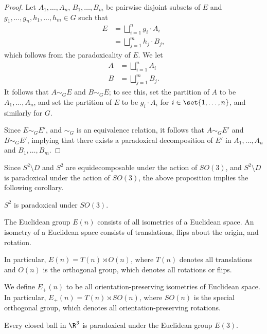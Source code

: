 \documentclass[12pt]{mypackage}
\begin{document}
\begin{proof}
  Let $A_1,\dots,A_n$, $B_1,\dots,B_m$ be pairwise disjoint subsets of $E$ and $g_1,\dots,g_n,h_1,\dots,h_m\in G$ such that
  \begin{align*}
    E &= \bigsqcup_{i=1}^{n} g_i\cdot A_i\\
      &= \bigsqcup_{j=1}^{m}h_j\cdot B_j,
  \end{align*}
  which follows from the paradoxicality of $E$. We let
  \begin{align*}
    A &= \bigsqcup_{i=1}^{n}A_i\\
    B &= \bigsqcup_{j=1}^{m} B_j.
  \end{align*}
  It follows that $A\sim_{G} E$ and $B\sim_{G} E$; to see this, set the partition of $A$ to be $A_1,\dots,A_n$, and set the partition of $E$ to be $g_i\cdot A_i$ for $i\in \set{1,\dots,n}$, and similarly for $G$.\newline

  Since $E\sim_{G} E'$, and $\sim_{G}$ is an equivalence relation, it follows that $A\sim_{G}E'$ and $B\sim_{G}E'$, implying that there exists a paradoxical decomposition of $E'$ in $A_1,\dots,A_n$ and $B_1,\dots,B_m$.
\end{proof}
Since $S^{2}\setminus D$ and $S^{2}$ are equidecomposable under the action of $SO(3)$, and $S^{2}\setminus D$ is paradoxical under the action of $SO(3)$, the above proposition implies the following corollary.
\begin{corollary}
  $S^{2}$ is paradoxical under $SO(3)$.
\end{corollary}
\begin{definition}
  The Euclidean group $E(n)$ consists of all isometries of a Euclidean space. An isometry of a Euclidean space consists of translations, flips about the origin, and rotation.\newline

  In particular, $E(n) = T(n)\rtimes O(n)$, where $T(n)$ denotes all translations and $O(n)$ is the orthogonal group, which denotes all rotations or flips.\newline

  We define $E_{+}(n)$ to be all orientation-preserving isometries of Euclidean space. In particular, $E_{+}(n) = T(n)\rtimes SO(n)$, where $SO(n)$ is the special orthogonal group, which denotes all orientation-preserving rotations.
\end{definition}
\begin{corollary}
  Every closed ball in $\R^3$ is paradoxical under the Euclidean group $E(3)$.
\end{corollary}
\end{document}
